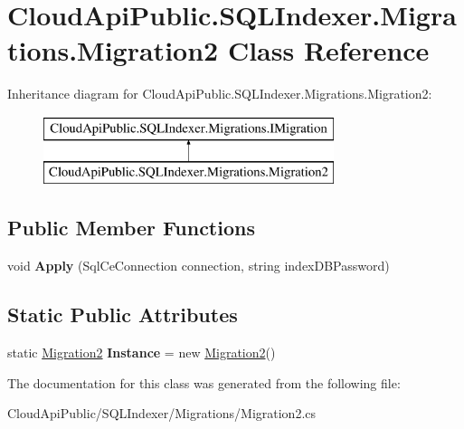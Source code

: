 \hypertarget{class_cloud_api_public_1_1_s_q_l_indexer_1_1_migrations_1_1_migration2}{\section{Cloud\-Api\-Public.\-S\-Q\-L\-Indexer.\-Migrations.\-Migration2 Class Reference}
\label{class_cloud_api_public_1_1_s_q_l_indexer_1_1_migrations_1_1_migration2}
}
Inheritance diagram for Cloud\-Api\-Public.\-S\-Q\-L\-Indexer.\-Migrations.\-Migration2\-:\begin{figure}[H]
\begin{center}
\leavevmode
\includegraphics[height=2.000000cm]{class_cloud_api_public_1_1_s_q_l_indexer_1_1_migrations_1_1_migration2}
\end{center}
\end{figure}
\subsection*{Public Member Functions}
\begin{DoxyCompactItemize}
\item 
\hypertarget{class_cloud_api_public_1_1_s_q_l_indexer_1_1_migrations_1_1_migration2_a5de41239bad372bbfdf37c78b4e35e38}{void {\bfseries Apply} (Sql\-Ce\-Connection connection, string index\-D\-B\-Password)}\label{class_cloud_api_public_1_1_s_q_l_indexer_1_1_migrations_1_1_migration2_a5de41239bad372bbfdf37c78b4e35e38}

\end{DoxyCompactItemize}
\subsection*{Static Public Attributes}
\begin{DoxyCompactItemize}
\item 
\hypertarget{class_cloud_api_public_1_1_s_q_l_indexer_1_1_migrations_1_1_migration2_ae2a07ae7c8a479172d87c25752f9be4d}{static \hyperlink{class_cloud_api_public_1_1_s_q_l_indexer_1_1_migrations_1_1_migration2}{Migration2} {\bfseries Instance} = new \hyperlink{class_cloud_api_public_1_1_s_q_l_indexer_1_1_migrations_1_1_migration2}{Migration2}()}\label{class_cloud_api_public_1_1_s_q_l_indexer_1_1_migrations_1_1_migration2_ae2a07ae7c8a479172d87c25752f9be4d}

\end{DoxyCompactItemize}


The documentation for this class was generated from the following file\-:\begin{DoxyCompactItemize}
\item 
Cloud\-Api\-Public/\-S\-Q\-L\-Indexer/\-Migrations/Migration2.\-cs\end{DoxyCompactItemize}
